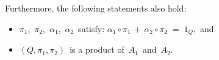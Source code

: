 \begin{proposition}
\begin{enumerate}
\begin{itemize}
	\end{itemize}
	Furthermore, the following statements also hold:
	\begin{itemize}
	\item
		$\pi_{1}$, \,$\pi_{2}$, \,$\alpha_{1}$, \,$\alpha_{2}$\, satisfy:
		\;$\alpha_{1} \circ \pi_{1} \,+\, \alpha_{2} \circ \pi_{2} \; = \; 1_{Q}$,\, and
	\item
		$(Q,\pi_{1},\pi_{2})$\, is a product of \,$A_{1}$\, and \,$A_{2}$.\,
	\end{itemize}
\end{enumerate}
\end{proposition}
\proof

